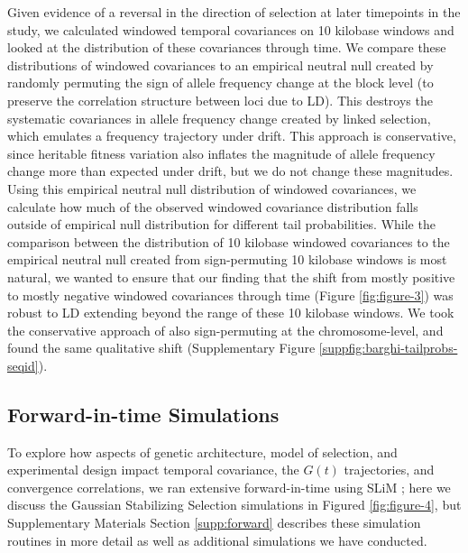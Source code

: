 \documentclass[11pt]{article}
\begin{document}
Given evidence of a reversal in the direction of selection at later timepoints
in the \textcite{Barghi2019-qy} study, we calculated windowed temporal
covariances on 10 kilobase windows and looked at the distribution of these
covariances through time. We compare these distributions of windowed
covariances to an empirical neutral null created by randomly permuting the sign
of allele frequency change at the block level (to preserve the correlation
structure between loci due to LD). This destroys the systematic covariances in
allele frequency change created by linked selection, which emulates a frequency
trajectory under drift. This approach is conservative, since heritable fitness
variation also inflates the magnitude of allele frequency change more than
expected under drift, but we do not change these magnitudes. Using this
empirical neutral null distribution of windowed covariances, we calculate how
much of the observed windowed covariance distribution falls outside of
empirical null distribution for different tail probabilities. While the
comparison between the distribution of 10 kilobase windowed covariances to the
empirical neutral null created from sign-permuting 10 kilobase windows is most
natural, we wanted to ensure that our finding that the shift from mostly
positive to mostly negative windowed covariances through time (Figure
\ref{fig:figure-3}) was robust to LD extending beyond the range of these 10
kilobase windows. We took the conservative approach of also sign-permuting at
the chromosome-level, and found the same qualitative shift (Supplementary
Figure \ref{suppfig:barghi-tailprobs-seqid}).

\subsection{Forward-in-time Simulations}

To explore how aspects of genetic architecture, model of selection, and
experimental design impact temporal covariance, the $G(t)$ trajectories, and
convergence correlations, we ran extensive forward-in-time using SLiM
\parencite{Haller2019-vu}; here we discuss the Gaussian Stabilizing Selection
simulations in Figured \ref{fig:figure-4}, but Supplementary Materials Section
\ref{supp:forward} describes these simulation routines in more detail as well
as additional simulations we have conducted.
\end{document}

